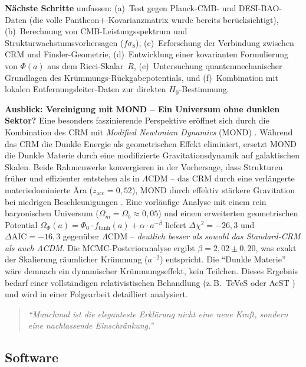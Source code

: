 \documentclass[aps,prd,twocolumn,superscriptaddress,nofootinbib]{revtex4-2}
\begin{document}
\textbf{N\"achste Schritte} umfassen: (a)~Test gegen Planck-CMB- und DESI-BAO-Daten (die volle Pantheon+-Kovarianzmatrix wurde bereits ber\"ucksichtigt), (b)~Berechnung von CMB-Leistungsspektrum und Strukturwachstumsvorhersagen ($f\sigma_8$), (c)~Erforschung der Verbindung zwischen CRM und Finsler-Geometrie, (d)~Entwicklung einer kovarianten Formulierung von $\Phi(a)$ aus dem Ricci-Skalar~$R$, (e)~Untersuchung quantenmechanischer Grundlagen des Kr\"ummungs-R\"uckgabepotentials, und (f)~Kombination mit lokalen Entfernungsleiter-Daten zur direkten $H_0$-Bestimmung.

\textbf{Ausblick: Vereinigung mit MOND -- Ein Universum ohne dunklen Sektor?} Eine besonders faszinierende Perspektive er\"offnet sich durch die Kombination des CRM mit \textit{Modified Newtonian Dynamics} (MOND) \cite{Milgrom1983}. W\"ahrend das CRM die Dunkle Energie als geometrischen Effekt eliminiert, ersetzt MOND die Dunkle Materie durch eine modifizierte Gravitationsdynamik auf galaktischen Skalen. Beide Rahmenwerke konvergieren in der Vorhersage, dass Strukturen fr\"uher und effizienter entstehen als in $\Lambda$CDM -- das CRM durch eine verl\"angerte materiedominierte \"Ara ($z_{\mathrm{acc}} = 0{,}52$), MOND durch effektiv st\"arkere Gravitation bei niedrigen Beschleunigungen \cite{Asencio2023}. Eine vorl\"aufige Analyse mit einem rein baryonischen Universum ($\Omega_m = \Omega_b \approx 0{,}05$) und einem erweiterten geometrischen Potential $\Omega_\Phi(a) = \Phi_0 \cdot f_{\mathrm{tanh}}(a) + \alpha \cdot a^{-\beta}$ liefert $\Delta\chi^2 = -26{,}3$ und $\Delta\mathrm{AIC} = -16{,}3$ gegen\"uber $\Lambda$CDM -- \textit{deutlich besser als sowohl das Standard-CRM als auch $\Lambda$CDM}. Die MCMC-Posterioranalyse ergibt $\beta = 2{,}02 \pm 0{,}20$, was exakt der Skalierung r\"aumlicher Kr\"ummung ($a^{-2}$) entspricht. Die ``Dunkle Materie'' w\"are demnach ein dynamischer Kr\"ummungseffekt, kein Teilchen. Dieses Ergebnis bedarf einer vollst\"andigen relativistischen Behandlung (z.\,B.\ TeVeS oder AeST \cite{Bekenstein2004,Skordis2021}) und wird in einer Folgearbeit detailliert analysiert.

\begin{quote}
\textit{``Manchmal ist die eleganteste Erkl\"arung nicht eine neue Kraft, sondern eine nachlassende Einschr\"ankung.''}
\end{quote}

\subsection*{Software}
\end{document}
